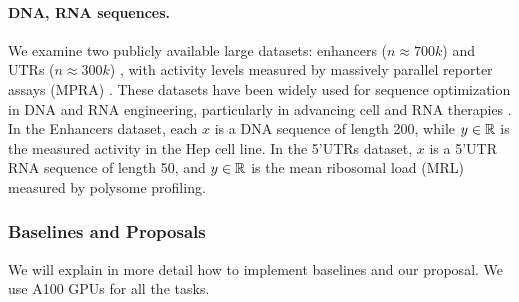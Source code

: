 \paragraph{DNA, RNA sequences.}  We examine two publicly available large datasets: enhancers ($n \approx 700k$) \citep{gosai2023machine} and UTRs ($n \approx 300k$) \citep{sample2019human}, with activity levels measured by massively parallel reporter assays (MPRA) \citep{inoue2019identification}. These datasets have been widely used for sequence optimization in DNA and RNA engineering, particularly in advancing cell and RNA therapies \citep{castillo2021machine,lal2024reglm,ferreira2024dna,uehara2024bridging}. In the Enhancers dataset, each $x$ is a DNA sequence of length 200, while $y \in \mathbb{R}$ is the measured activity in the Hep cell line. In the 5'UTRs dataset, $x$ is a 5'UTR RNA sequence of length 50, and $y \in \mathbb{R}$ is the mean ribosomal load (MRL) measured by polysome profiling.


\subsubsection{Baselines and Proposals}

We will explain in more detail how to implement baselines and our proposal. We use A100 GPUs for all the tasks. 

